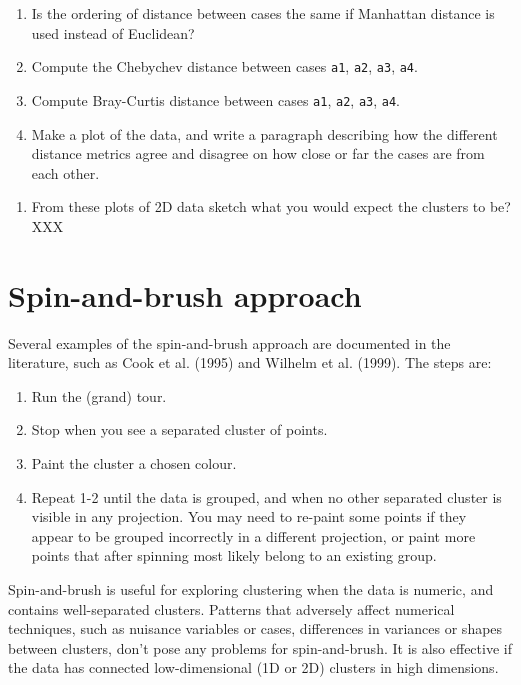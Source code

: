 \documentclass[
  letterpaper,
]{krantz}
\providecommand{\tightlist}{%
  \setlength{\itemsep}{0pt}\setlength{\parskip}{0pt}}\usepackage{longtable,booktabs,array}
\begin{document}
\begin{enumerate}
\def\labelenumi{\arabic{enumi}.}
\setcounter{enumi}{3}
\item
  Is the ordering of distance between cases the same if Manhattan
  distance is used instead of Euclidean?
\item
  Compute the Chebychev distance between cases \texttt{a1}, \texttt{a2},
  \texttt{a3}, \texttt{a4}.
\item
  Compute Bray-Curtis distance between cases \texttt{a1}, \texttt{a2},
  \texttt{a3}, \texttt{a4}.
\item
  Make a plot of the data, and write a paragraph describing how the
  different distance metrics agree and disagree on how close or far the
  cases are from each other.
\end{enumerate}

\begin{enumerate}
\def\labelenumi{\arabic{enumi}.}
\setcounter{enumi}{7}
\tightlist
\item
  From these plots of 2D data sketch what you would expect the clusters
  to be? XXX
\end{enumerate}

\chapter{Spin-and-brush approach}\label{sec-clust-graphics}

 

Several examples of the spin-and-brush approach are documented in the
literature, such as Cook et al. (1995) and Wilhelm et al. (1999). The
steps are:

\begin{enumerate}
\def\labelenumi{\arabic{enumi}.}
\tightlist
\item
  Run the (grand) tour.
\item
  Stop when you see a separated cluster of points.
\item
  Paint the cluster a chosen colour.
\item
  Repeat 1-2 until the data is grouped, and when no other separated
  cluster is visible in any projection. You may need to re-paint some
  points if they appear to be grouped incorrectly in a different
  projection, or paint more points that after spinning most likely
  belong to an existing group.
\end{enumerate}

Spin-and-brush is useful for exploring clustering when the data is
numeric, and contains well-separated clusters. Patterns that adversely
affect numerical techniques, such as nuisance variables or cases,
differences in variances or shapes between clusters, don't pose any
problems for spin-and-brush. It is also effective if the data has
connected low-dimensional (1D or 2D) clusters in high dimensions.
\end{document}
